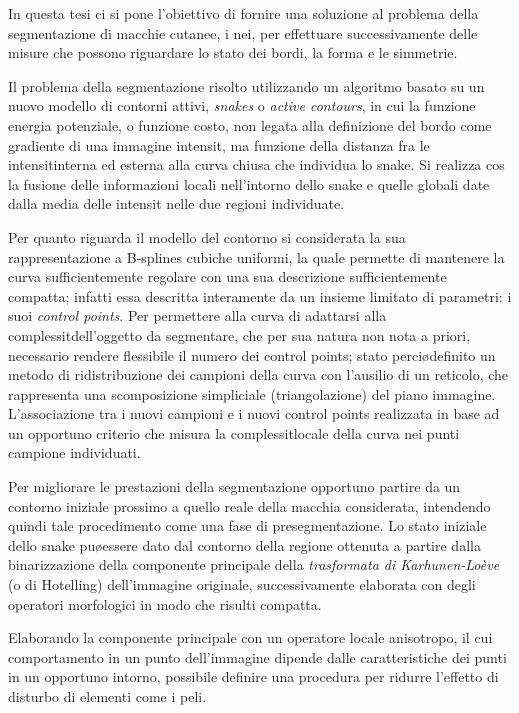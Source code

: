 \preface

In questa tesi ci si pone l'obiettivo di fornire una soluzione al problema della segmentazione
di macchie cutanee, i nei, per effettuare successivamente delle misure che possono riguardare
lo stato dei bordi, la forma e le simmetrie.

Il problema della segmentazione \e risolto utilizzando un algoritmo basato su un nuovo modello
di contorni attivi, {\it snakes} o {\it active contours}, in cui la funzione energia
potenziale, o funzione costo, non \e legata alla definizione del bordo come gradiente di una
immagine intensit\aac, ma \e funzione della distanza fra le intensit\a interna ed esterna
alla curva chiusa che individua lo snake.
Si realizza cos\iac\,\,la fusione delle informazioni locali nell'intorno dello snake e quelle
globali date dalla media delle intensit\aac\,\,nelle due regioni individuate.

Per quanto riguarda il modello del contorno si \e considerata la sua rappresentazione a
B-splines cubiche uniformi, la quale permette di mantenere la curva sufficientemente regolare
con una sua descrizione sufficientemente compatta; infatti essa \e descritta interamente da
un insieme limitato di parametri: i suoi {\it control points}.
Per permettere alla curva di adattarsi alla complessit\a dell'oggetto da segmentare, che per
sua natura non \e nota a priori, \e necessario rendere flessibile il numero dei control points;
\e stato perci\o definito un metodo di ridistribuzione dei campioni della curva con l'ausilio
di un reticolo, che rappresenta una scomposizione simpliciale (triangolazione) del piano
immagine.
L'associazione tra i nuovi campioni e i nuovi control points \e realizzata in base ad un
opportuno criterio che misura la complessit\a locale della curva nei punti campione
individuati.

Per migliorare le prestazioni della segmentazione \e opportuno partire da un contorno
iniziale prossimo a quello reale della macchia considerata, intendendo quindi tale
procedimento come una fase di presegmentazione.
Lo stato iniziale dello snake pu\o essere dato dal contorno della regione ottenuta a partire
dalla binarizzazione della componente principale della {\it trasformata di Karhunen-Lo\`eve}
(o di {Hotelling}) dell'immagine originale, successivamente elaborata con degli operatori
morfologici in modo che risulti compatta.

Elaborando la componente principale con un operatore locale anisotropo, il cui
comportamento in un punto dell'immagine dipende dalle caratteristiche dei punti in un
opportuno intorno, \e possibile definire una procedura per ridurre l'effetto di disturbo
di elementi come i peli.